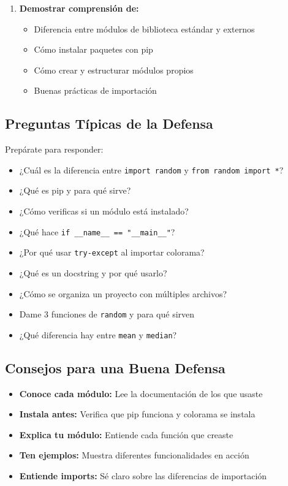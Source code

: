 \documentclass[12pt,a4paper]{article}
\begin{document}
\begin{enumerate}[leftmargin=*]
    \item \textbf{Demostrar comprensión de:}
    \begin{itemize}
        \item Diferencia entre módulos de biblioteca estándar y externos
        \item Cómo instalar paquetes con pip
        \item Cómo crear y estructurar módulos propios
        \item Buenas prácticas de importación
    \end{itemize}
\end{enumerate}

\subsection{Preguntas Típicas de la Defensa}

Prepárate para responder:

\begin{itemize}[leftmargin=*]
    \item ¿Cuál es la diferencia entre \texttt{import random} y \texttt{from random import *}?
    \item ¿Qué es pip y para qué sirve?
    \item ¿Cómo verificas si un módulo está instalado?
    \item ¿Qué hace \texttt{if \_\_name\_\_ == "\_\_main\_\_"}?
    \item ¿Por qué usar \texttt{try-except} al importar colorama?
    \item ¿Qué es un docstring y por qué usarlo?
    \item ¿Cómo se organiza un proyecto con múltiples archivos?
    \item Dame 3 funciones de \texttt{random} y para qué sirven
    \item ¿Qué diferencia hay entre \texttt{mean} y \texttt{median}?
\end{itemize}

\subsection{Consejos para una Buena Defensa}

\begin{itemize}[leftmargin=*]
    \item \textbf{Conoce cada módulo:} Lee la documentación de los que usaste
    \item \textbf{Instala antes:} Verifica que pip funciona y colorama se instala
    \item \textbf{Explica tu módulo:} Entiende cada función que creaste
    \item \textbf{Ten ejemplos:} Muestra diferentes funcionalidades en acción
    \item \textbf{Entiende imports:} Sé claro sobre las diferencias de importación
\end{itemize}
\end{document}
